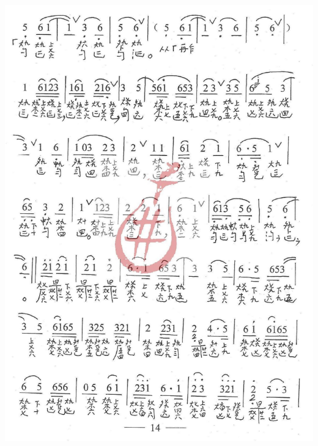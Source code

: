 \documentclass[cn,pad,twocol]{elegantbook}
\begin{document}
\paragraph*{\includegraphics[width=\textwidth]{mudanting/2021-牡丹亭-14回生}} 
\end{document}
